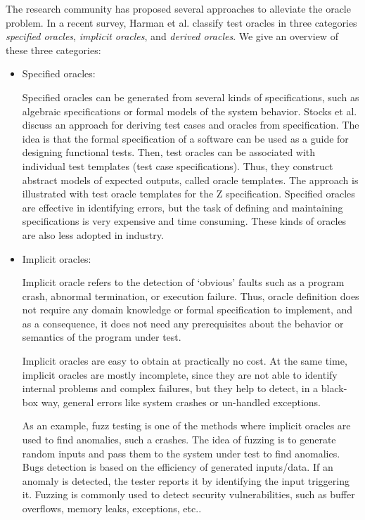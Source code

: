 The research community has proposed several approaches\cite{harman2013comprehensive,barr2015oracle} to alleviate the oracle problem. 
In a recent survey, Harman et al.\cite{harman2013comprehensive} classify test oracles in three categories \textit{specified oracles}, \textit{implicit oracles}, and \textit{derived oracles}. We give an overview of these three categories:
\begin{itemize}
	\item Specified oracles:
	
	Specified oracles can be generated from several kinds of specifications, such as algebraic specifications or formal models of the system behavior. 	
	Stocks et al.\cite{stocks1996framework,richardson1992specification} discuss an approach for deriving test cases and oracles from specification. The idea is that the formal specification of a software can be used as a guide for designing functional tests. Then, test oracles can be associated with individual test templates (test case specifications). Thus, they construct abstract models of expected outputs, called oracle templates. 
	The approach is illustrated with test oracle templates for the Z specification.
	Specified oracles are effective in identifying errors, but the task of defining and maintaining specifications is very expensive and time consuming. These kinds of oracles are also less adopted in industry.
	
	\item Implicit oracles:
	
	Implicit oracle refers to the detection of ‘obvious’ faults such as a program crash, abnormal termination, or execution failure.
	Thus, oracle definition does not require any domain knowledge or formal specification to implement, and as a consequence, it does not need any prerequisites about the behavior or semantics of the program under test.
	
	Implicit oracles\cite{harman2013comprehensive,barr2015oracle} are easy to obtain at practically no cost. At the same time, implicit oracles are mostly incomplete, since they are not able to identify internal problems and complex failures, but they help to detect, in a black-box way, general errors like system crashes or un-handled exceptions.
	
	As an example, fuzz testing\cite{miller1990empirical} is one of the methods where implicit oracles are used to find anomalies, such a crashes. The idea of fuzzing is to generate random inputs and
	pass them to the system under test to find anomalies.
	Bugs detection is based on the efficiency of generated inputs/data. If an anomaly is detected,
	the tester reports it by identifying the input triggering it. 
	Fuzzing is commonly used to detect security vulnerabilities, such as buffer overflows, memory   leaks, exceptions, etc.\cite{bekrar2011finding}.
	

\end{itemize}

